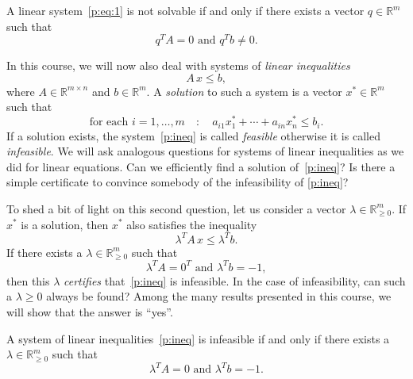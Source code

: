 \begin{theorem}
  \label{thr:8}
  A linear system~\eqref{p:eq:1} is not solvable if and only if there exists a vector $q ∈ ℝ^m$ such that 
  \begin{displaymath}
    q^T A = 0 \text{ and } q^T b \neq 0. 
  \end{displaymath}
\end{theorem}

In this course, we will now also deal with systems of \emph{linear inequalities} 
\begin{equation}
  \label{p:ineq}
  A \,x ≤ b,
\end{equation}
where $A ∈ ℝ^{m × n}$ and $b ∈ ℝ^m$. A \emph{solution} to such a system is a vector $x^* ∈ ℝ^m$ such that
\begin{equation}
  \label{p:sol}
 \text{for each } i=1,\dots,m \quad : \quad   a_{i1} x^*_1 + \cdots + a_{in} x^*_n \leq b_i.  
\end{equation}
If a solution exists, the system~\eqref{p:ineq} is called \emph{feasible} otherwise it is called \emph{infeasible}. 
We will ask analogous questions for  systems of linear inequalities as we did for linear equations. Can we efficiently find a solution of~\eqref{p:ineq}?  Is there a simple certificate to convince somebody of the infeasibility of \eqref{p:ineq}? 

To shed a bit of light on this second question, let us consider a vector $λ ∈ ℝ^m_{≥0}$. If $x^*$ is a solution, then $x^*$ also satisfies the inequality 
\begin{equation}
  \label{p:impli}
  λ^T A \, x ≤ λ^T b.
\end{equation}
If there exists a $λ \in ℝ^m_{≥0}$ such that 
\begin{equation}
  \label{p:Farkas} 
  λ^T A = 0^T \text{ and } λ^T b = -1,
\end{equation}
then this $λ$ \emph{certifies} that~\eqref{p:ineq} is infeasible. In the case of infeasibility, can such a $λ≥0$ always be found? Among the many results presented in  this course,  we will show that the answer is ``yes''. 
\begin{theorem}
  \label{thr:7}
  A system of linear inequalities~\eqref{p:ineq} is infeasible if and only if there exists a $λ ∈ ℝ^m_{≥0}$ such that 
  \begin{displaymath}
    λ^T A = 0 \text{ and } λ^T b = -1.
  \end{displaymath}
\end{theorem}


